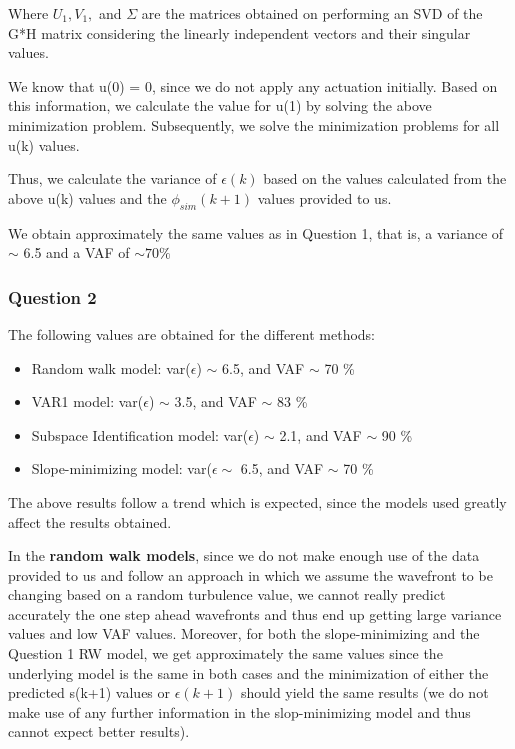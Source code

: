 \documentclass[12pt]{report}
\begin{document}
Where $U_{1}, V_{1},$ and $\Sigma$ are the matrices obtained on performing an SVD of the G*H matrix considering the linearly independent vectors and their singular values.

We know that u(0) = 0, since we do not apply any actuation initially. Based on this information, we calculate the value for u(1) by solving the above minimization problem. Subsequently, we solve the minimization problems for all u(k) values.

Thus, we calculate the variance of $\epsilon(k)$ based on the values calculated from the above u(k) values and the $\phi_{sim}(k+1)$ values provided to us.

We obtain approximately the same values as in Question 1, that is, a variance of $\sim$ 6.5 and a VAF of $\sim 70 \%$

\subsubsection*{Question 2}

The following values are obtained for the different methods:

\begin{itemize}
	\item Random walk model: var($\epsilon$) $\sim$ 6.5, and VAF $\sim$ 70 \%
	\item VAR1 model: var($\epsilon$) $\sim$ 3.5, and VAF $\sim$ 83 \%
	\item Subspace Identification model: var($\epsilon$) $\sim$ 2.1, and VAF $\sim$ 90 \%
	\item Slope-minimizing model: var($\epsilon \sim$ 6.5, and VAF $\sim$ 70 \%
\end{itemize}

The above results follow a trend which is expected, since the models used greatly affect the results obtained.

In the \textbf{random walk models}, since we do not make enough use of the data provided to us and follow an approach in which we assume the wavefront to be changing based on a random turbulence value, we cannot really predict accurately the one step ahead wavefronts and thus end up getting large variance values and low VAF values. Moreover, for both the slope-minimizing and the Question 1 RW model, we get approximately the same values since the underlying model is the same in both cases and the minimization of either the predicted s(k+1) values or $\epsilon(k+1)$ should yield the same results (we do not make use of any further information in the slop-minimizing model and thus cannot expect better results).
\end{document}
